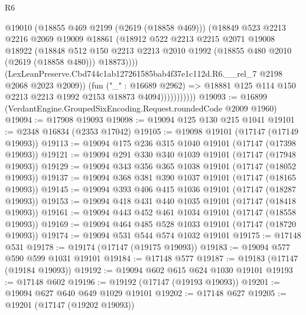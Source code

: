 \begin{lexlean}{R6}
\begin{coremodule}
                            @19010
                            (@18855 @469 @2199 (@2619 (@18858 @469)))
                            (@18849
                              @523
                              @2213
                              @2216
                              @2069
                              @19009
                              @18861
                              (@18912
                                @522
                                @2213
                                @2215
                                @2071
                                @19008
                                @18922
                                (@18848
                                  @512
                                  @150
                                  @2213
                                  @2213
                                  @2010
                                  @1992
                                  (@18855 @480 @2010 (@2619 (@18858 @480)))
                                  @18873))))
                          (LexLeanPreserve.Cbd744c1ab127261585bab4f37e1c112d.R6.__rel_7
                            @2198
                            @2068
                            @2023
                            @2009))
                        (fun ("_" : @16689 @2962) =>
                        @18881 @125 @114 @150 @2213 @2213 @1992 @2153 @18873 @4094)))))))))))
@19093 := @16899 (VerdantEngine.GroupedSixEncoding.Request.roundedCode @2009 @1960)
@19094 := @17908 @19093
@19098 := @19094 @125 @130 @215 @1041
@19101 := @2348 @16834 (@2353 @17042)
@19105 := @19098 @19101 (@17147 (@17149 @19093))
@19113 := @19094 @175 @236 @315 @1040 @19101 (@17147 (@17398 @19093))
@19121 := @19094 @291 @330 @340 @1039 @19101 (@17147 (@17948 @19093))
@19129 := @19094 @343 @356 @365 @1038 @19101 (@17147 (@18052 @19093))
@19137 := @19094 @368 @381 @390 @1037 @19101 (@17147 (@18165 @19093))
@19145 := @19094 @393 @406 @415 @1036 @19101 (@17147 (@18287 @19093))
@19153 := @19094 @418 @431 @440 @1035 @19101 (@17147 (@18418 @19093))
@19161 := @19094 @443 @452 @461 @1034 @19101 (@17147 (@18558 @19093))
@19169 := @19094 @464 @485 @528 @1033 @19101 (@17147 (@18720 @19093))
@19174 := @19094 @531 @544 @574 @1032 @19101
@19175 := @17148 @531
@19178 := @19174 (@17147 (@19175 @19093))
@19183 := @19094 @577 @590 @599 @1031 @19101
@19184 := @17148 @577
@19187 := @19183 (@17147 (@19184 @19093))
@19192 := @19094 @602 @615 @624 @1030 @19101
@19193 := @17148 @602
@19196 := @19192 (@17147 (@19193 @19093))
@19201 := @19094 @627 @640 @649 @1029 @19101
@19202 := @17148 @627
@19205 := @19201 (@17147 (@19202 @19093))

\end{coremodule}
\end{lexlean}
